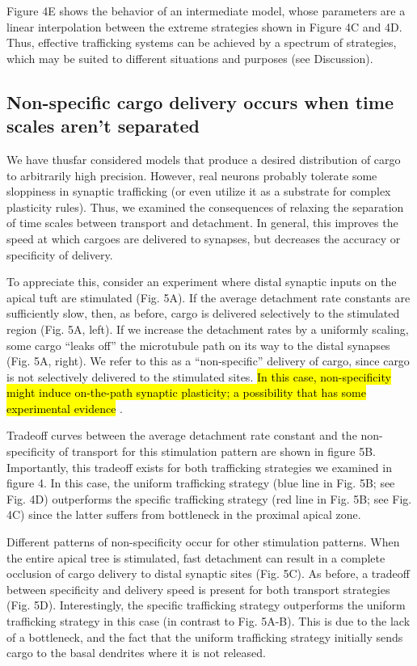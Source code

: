 \documentclass[10pt]{wlpeerj}
\begin{document}
Figure 4E shows the behavior of an intermediate model, whose parameters are a linear interpolation between the extreme strategies shown in Figure 4C and 4D. Thus, effective trafficking systems can be achieved by a spectrum of strategies, which may be suited to different situations and purposes (see Discussion). 

\subsection*{Non-specific cargo delivery occurs when time scales aren't separated}

We have thusfar considered models that produce a desired distribution of cargo to arbitrarily high precision. However, real neurons probably tolerate some sloppiness in synaptic trafficking (or even utilize it as a substrate for complex plasticity rules). Thus, we examined the consequences of relaxing the separation of time scales between transport and detachment. In general, this improves the speed at which cargoes are delivered to synapses, but decreases the accuracy or specificity of delivery.

To appreciate this, consider an experiment where distal synaptic inputs on the apical tuft are stimulated (Fig. 5A). If the average detachment rate constants are sufficiently slow, then, as before, cargo is delivered selectively to the stimulated region (Fig. 5A, left). If we increase the detachment rates by a uniformly scaling, some cargo ``leaks off'' the microtubule path on its way to the distal synapses (Fig. 5A, right). We refer to this as a ``non-specific'' delivery of cargo, since cargo is not selectively delivered to the stimulated sites. \hl{In this case, non-specificity might induce on-the-path synaptic plasticity; a possibility that has some experimental evidence} \citep{Han_2013}.

Tradeoff curves between the average detachment rate constant and the non-specificity of transport for this stimulation pattern are shown in figure 5B. Importantly, this tradeoff exists for both trafficking strategies we examined in figure 4. In this case, the uniform trafficking strategy (blue line in Fig. 5B; see Fig. 4D) outperforms the specific trafficking strategy (red line in Fig. 5B; see Fig. 4C) since the latter suffers from bottleneck in the proximal apical zone.

Different patterns of non-specificity occur for other stimulation patterns. When the entire apical tree is stimulated, fast detachment can result in a complete occlusion of cargo delivery to distal synaptic sites (Fig. 5C). As before, a tradeoff between specificity and delivery speed is present for both transport strategies (Fig. 5D). Interestingly, the specific trafficking strategy outperforms the uniform trafficking strategy in this case (in contrast to Fig. 5A-B). This is due to the lack of a bottleneck, and the fact that the uniform trafficking strategy initially sends cargo to the basal dendrites where it is not released.
\end{document}
